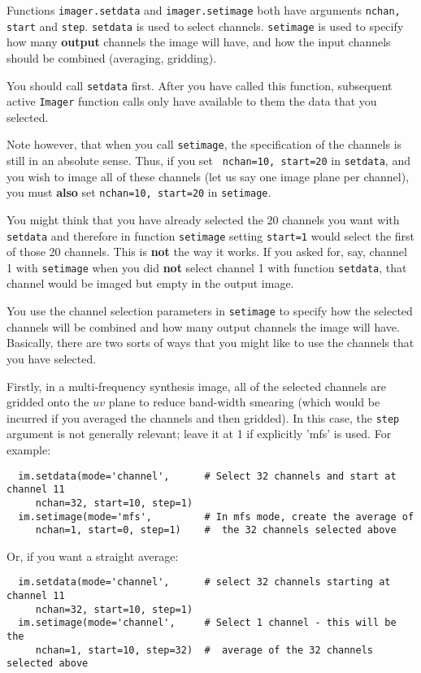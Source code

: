 Functions {\tt imager.setdata} and {\tt imager.setimage} both have
arguments {\tt nchan, start} and {\tt step}.  {\tt setdata} is used to
select channels.  {\tt setimage} is used to specify how many {\bf
output} channels the image will have, and how the input channels
should be combined (averaging, gridding).

You should call {\tt setdata} first.  After you have called this
function, subsequent active {\tt Imager} function calls only have
available to them the data that you selected.

Note however, that when you call {\tt setimage}, the specification of
the channels is still in an absolute sense.  Thus, if you set {\tt
nchan=10, start=20} in {\tt setdata}, and you wish to image all of
these channels (let us say one image plane per channel), you must {\bf
also} set {\tt nchan=10, start=20} in {\tt setimage}.

You might think that you have already selected the 20 channels you
want with {\tt setdata} and therefore in function {\tt setimage}
setting {\tt start=1} would select the first of those 20 channels.
This is {\bf not} the way it works.  If you asked for, say, channel 1
with {\tt setimage} when you did {\bf not} select channel 1 with
function {\tt setdata}, that channel would be imaged but empty in the
output image.

You use the channel selection parameters in {\tt setimage} to
specify how the selected channels will be combined and how many output
channels the image will have.  Basically, there are two sorts of ways
that you might like to use the channels that you have selected.

Firstly, in a multi-frequency synthesis image, all of the selected
channels are gridded onto the $uv$ plane to reduce band-width smearing
(which would be incurred if you averaged the channels and then
gridded).  In this case, the {\tt step} argument is not generally
relevant; leave it at 1 if explicitly 'mfs' is used.  For example:

\small
\begin{verbatim}
  im.setdata(mode='channel',      # Select 32 channels and start at channel 11
     nchan=32, start=10, step=1)
  im.setimage(mode='mfs',         # In mfs mode, create the average of
     nchan=1, start=0, step=1)    #  the 32 channels selected above
\end{verbatim}
\normalsize

Or, if you want a straight average:

\small
\begin{verbatim}
  im.setdata(mode='channel',      # select 32 channels starting at channel 11
     nchan=32, start=10, step=1)
  im.setimage(mode='channel',     # Select 1 channel - this will be the
     nchan=1, start=10, step=32)  #  average of the 32 channels selected above
\end{verbatim}
\normalsize


